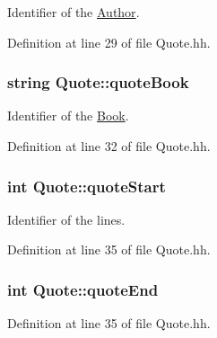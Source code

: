 Identifier of the \hyperlink{class_author}{Author}. 



Definition at line 29 of file Quote.\+hh.

\subsubsection[{\texorpdfstring{quote\+Book}{quoteBook}}]{\setlength{\rightskip}{0pt plus 5cm}string Quote\+::quote\+Book\hspace{0.3cm}{\ttfamily [private]}}\hypertarget{class_quote_a7e6968e086bdd45b40627a37ecbbf6fc}{}\label{class_quote_a7e6968e086bdd45b40627a37ecbbf6fc}


Identifier of the \hyperlink{class_book}{Book}. 



Definition at line 32 of file Quote.\+hh.

\subsubsection[{\texorpdfstring{quote\+Start}{quoteStart}}]{\setlength{\rightskip}{0pt plus 5cm}int Quote\+::quote\+Start\hspace{0.3cm}{\ttfamily [private]}}\hypertarget{class_quote_ac426122ac24638740b2a5c5e8342e8c9}{}\label{class_quote_ac426122ac24638740b2a5c5e8342e8c9}


Identifier of the lines. 



Definition at line 35 of file Quote.\+hh.

\subsubsection[{\texorpdfstring{quote\+End}{quoteEnd}}]{\setlength{\rightskip}{0pt plus 5cm}int Quote\+::quote\+End\hspace{0.3cm}{\ttfamily [private]}}\hypertarget{class_quote_aa5953a477b96183c8dc2fc8a42001c29}{}\label{class_quote_aa5953a477b96183c8dc2fc8a42001c29}


Definition at line 35 of file Quote.\+hh.


